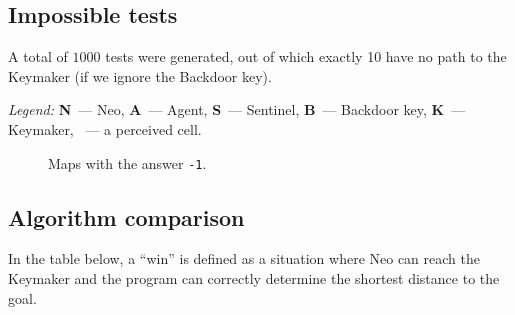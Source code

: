 \documentclass[10pt]{article}
\begin{document}
\subsection{Impossible tests}
A total of $1000$ tests were generated, out of which exactly 10 have no path to the Keymaker (if we ignore the Backdoor key).

\begin{center}

\end{center}
\begin{flushright}
\textit{Legend:} \textbf{N}~--- Neo, \textbf{A}~--- Agent, \textbf{S}~--- Sentinel, \textbf{B}~--- Backdoor key, \textbf{K}~--- Keymaker, ~--- a perceived cell.
\end{flushright}
\begin{figure}[!h]
\caption{Maps with the answer \texttt{-1}.}\label{impossibletests}
\end{figure}

\subsection{Algorithm comparison}
In the table below, a ``win'' is defined as a situation where Neo can reach the Keymaker and the program can correctly determine the shortest distance to the goal.
\end{document}
